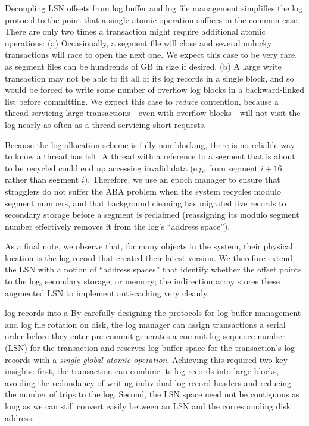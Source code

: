 Decoupling LSN offsets from log buffer and log file management simplifies the log protocol to the point that a single atomic operation suffices in the common case. There are only two times a transaction might require additional atomic operations: (a) Occasionally, a segment file will close and several unlucky transactions will race to open the next one. We expect this case to be very rare, as segment files can be hundrends of GB in size if desired. (b) A large write transaction may not be able to fit all of its log records in a single block, and so would be forced to write some number of overflow log blocks in a backward-linked list before committing. We expect this case to {\em reduce} contention, because a thread servicing large transactions---even with overflow blocks---will not visit the log nearly as often as a thread servicing short requests.

Because the log allocation scheme is fully non-blocking, there is no reliable way to know a thread has left. A thread with a reference to a segment that is about to be recycled could end up accessing invalid data (e.g. from segment $i+16$ rather than segment $i$). Therefore, we use an epoch manager to ensure that stragglers do not suffer the ABA problem when the system recycles modulo segment numbers, and that background cleaning has migrated live records to secondary storage before a segment is reclaimed (reassigning its modulo segment number effectively removes it from the log's ``address space'').

As a final note, we observe that, for many objects in the system, their physical location is the log record that created their latest version. We therefore extend the LSN with a notion of ``address spaces'' that identify whether the offset points to the log, secondary storage, or memory; the indirection array stores these augmented LSN to implement anti-caching very cleanly. 

log records into a 
By carefully designing the protocols for log buffer management and log file rotation on disk, the log manager can assign transactions a serial order before they enter pre-commit generates a commit log sequence number (LSN) for the transaction and reserves log buffer space for the transaction's log records with a \textit{single global atomic operation}. Achieving this required two key insights: first, the transaction can combine its log records into large blocks, avoiding the redundancy of writing individual log record headers and reducing the number of trips to the log. Second, the LSN space need not be contiguous as long as we can still convert easily between an LSN and the corresponding disk address.

